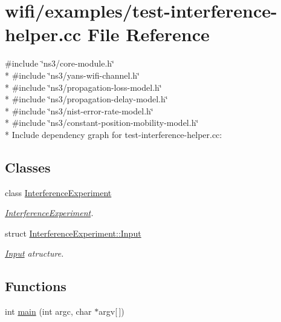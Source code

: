 \hypertarget{test-interference-helper_8cc}{}\section{wifi/examples/test-\/interference-\/helper.cc File Reference}
\label{test-interference-helper_8cc}
{\ttfamily \#include \char`\"{}ns3/core-\/module.\+h\char`\"{}}\\*
{\ttfamily \#include \char`\"{}ns3/yans-\/wifi-\/channel.\+h\char`\"{}}\\*
{\ttfamily \#include \char`\"{}ns3/propagation-\/loss-\/model.\+h\char`\"{}}\\*
{\ttfamily \#include \char`\"{}ns3/propagation-\/delay-\/model.\+h\char`\"{}}\\*
{\ttfamily \#include \char`\"{}ns3/nist-\/error-\/rate-\/model.\+h\char`\"{}}\\*
{\ttfamily \#include \char`\"{}ns3/constant-\/position-\/mobility-\/model.\+h\char`\"{}}\\*
Include dependency graph for test-\/interference-\/helper.cc\+:
\subsection*{Classes}
\begin{DoxyCompactItemize}
\item 
class \hyperlink{classInterferenceExperiment}{Interference\+Experiment}
\begin{DoxyCompactList}\small\item\em \hyperlink{classInterferenceExperiment}{Interference\+Experiment}. \end{DoxyCompactList}\item 
struct \hyperlink{structInterferenceExperiment_1_1Input}{Interference\+Experiment\+::\+Input}
\begin{DoxyCompactList}\small\item\em \hyperlink{structInterferenceExperiment_1_1Input}{Input} atructure. \end{DoxyCompactList}\end{DoxyCompactItemize}
\subsection*{Functions}
\begin{DoxyCompactItemize}
\item 
int \hyperlink{test-interference-helper_8cc_a0ddf1224851353fc92bfbff6f499fa97}{main} (int argc, char $\ast$argv\mbox{[}$\,$\mbox{]})
\end{DoxyCompactItemize}


